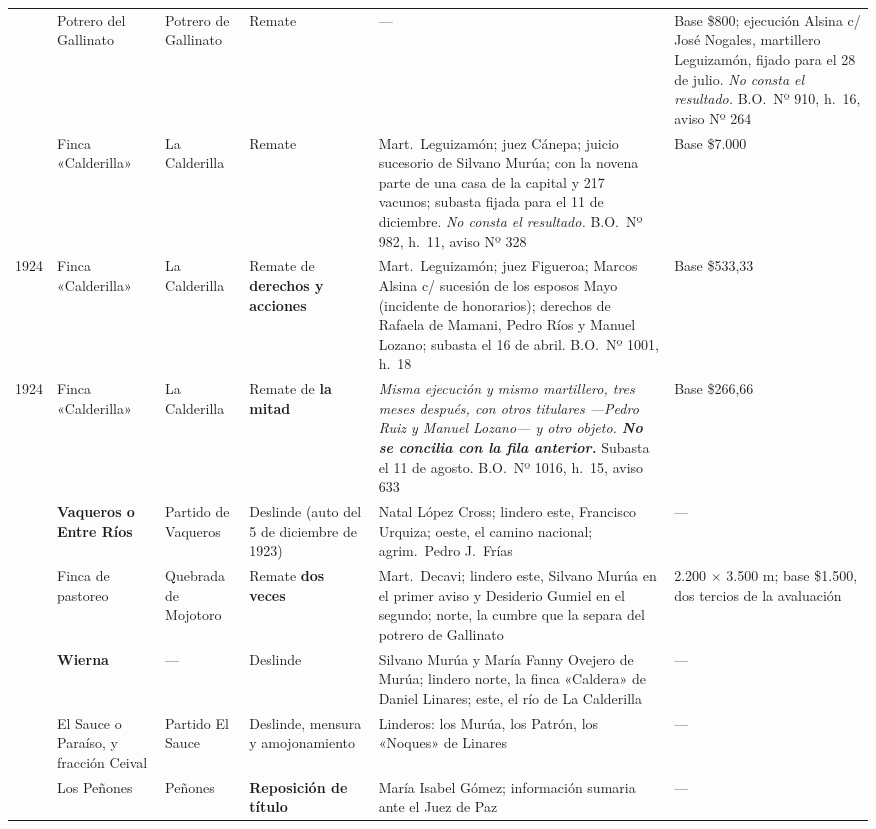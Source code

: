 {\begin{longtable}{@{}p{0.8cm}p{2.4cm}p{1.6cm}p{2.1cm}p{2.9cm}p{2.1cm}@{}}
\addlinespace
1922 & Potrero del Gallinato & Potrero de Gallinato & Remate & --- & Base \$800; ejecución Alsina c/ José Nogales, martillero Leguizamón, fijado para el 28 de julio. \textit{No consta el resultado.} B.O.\ Nº 910, h.\ 16, aviso Nº 264 \\
\addlinespace
1923 & Finca «Calderilla» & La Calderilla & Remate & Mart.\ Leguizamón; juez Cánepa; juicio sucesorio de Silvano Murúa\index{Murúa, Silvano}; con la novena parte de una casa de la capital y 217 vacunos; subasta fijada para el 11 de diciembre. \textit{No consta el resultado.} B.O.\ Nº 982, h.\ 11, aviso Nº 328 & Base \$7.000 \\
1924 & Finca «Calderilla» & La Calderilla & Remate de \textbf{derechos y acciones} & Mart.\ Leguizamón; juez Figueroa; Marcos Alsina c/ sucesión de los esposos Mayo (incidente de honorarios); derechos de Rafaela de Mamani, Pedro Ríos y Manuel Lozano; subasta el 16 de abril. B.O.\ Nº 1001, h.\ 18 & Base \$533,33 \\
1924 & Finca «Calderilla» & La Calderilla & Remate de \textbf{la mitad} & \textit{Misma ejecución y mismo martillero, tres meses después, con otros titulares ---Pedro Ruiz y Manuel Lozano--- y otro objeto. \textbf{No se concilia con la fila anterior.}} Subasta el 11 de agosto. B.O.\ Nº 1016, h.\ 15, aviso 633 & Base \$266,66 \\
\addlinespace
1924 & \textbf{Vaqueros o Entre Ríos} & Partido de Vaqueros & Deslinde (auto del 5 de diciembre de 1923) & Natal López Cross; lindero este, Francisco Urquiza\index{Urquiza, Francisco S.}; oeste, el camino nacional; agrim.\ Pedro J.\ Frías & --- \\
\addlinespace
1924 & Finca de pastoreo & Quebrada de Mojotoro & Remate \textbf{dos veces} & Mart.\ Decavi; lindero este, Silvano Murúa en el primer aviso y Desiderio Gumiel en el segundo; norte, la cumbre que la separa del potrero de Gallinato & 2.200 $\times$ 3.500 m; base \$1.500, dos tercios de la avaluación \\
\addlinespace
1924 & \textbf{Wierna} & --- & Deslinde & Silvano Murúa y María Fanny Ovejero de Murúa; lindero norte, la finca «Caldera» de Daniel Linares\index{Linares, Daniel}; este, el río de La Calderilla & --- \\
\addlinespace
1925 & El Sauce o Paraíso, y fracción Ceival & Partido El Sauce & Deslinde, mensura y amojonamiento & Linderos: los Murúa, los Patrón, los «Noques» de Linares & --- \\
\addlinespace
1926 & Los Peñones & Peñones & \textbf{Reposición de título} & María Isabel Gómez; información sumaria ante el Juez de Paz & --- \\

\end{longtable}}
